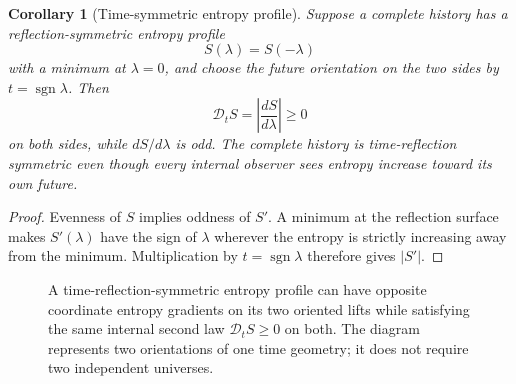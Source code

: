 \documentclass[11pt]{article}
\newcommand{\sgn}{\operatorname{sgn}}
\newtheorem{corollary}[theorem]{Corollary}
\theoremstyle{definition}\newtheorem{definition}[theorem]{Definition}
\theoremstyle{remark}\newtheorem{remark}[theorem]{Remark}\newtheorem{conjecture}[theorem]{Conjecture}
\begin{document}
\begin{corollary}[Time-symmetric entropy profile]\label{cor:timesymentropy}
Suppose a complete history has a reflection-symmetric entropy profile
\begin{equation}\label{eq:Seven}
 S(\lambda)=S(-\lambda)
\end{equation}
with a minimum at $\lambda=0$, and choose the future orientation on the two sides by $t=\sgn\lambda$. Then
\begin{equation}
 \mathscr D_tS=\left|\frac{dS}{d\lambda}\right|\ge0
\end{equation}
on both sides, while $dS/d\lambda$ is odd. The complete history is time-reflection symmetric even though every internal observer sees entropy increase toward its own future.
\end{corollary}
\begin{proof}
Evenness of $S$ implies oddness of $S'$. A minimum at the reflection surface makes $S'(\lambda)$ have the sign of $\lambda$ wherever the entropy is strictly increasing away from the minimum. Multiplication by $t=\sgn\lambda$ therefore gives $|S'|$.
\end{proof}

\begin{figure}[t]
\centering
{}
\caption{A time-reflection-symmetric entropy profile can have opposite coordinate entropy gradients on its two oriented lifts while satisfying the same internal second law $\mathscr D_tS\ge0$ on both. The diagram represents two orientations of one time geometry; it does not require two independent universes.}
\label{fig:timesymmetricentropy}
\end{figure}
\end{document}

